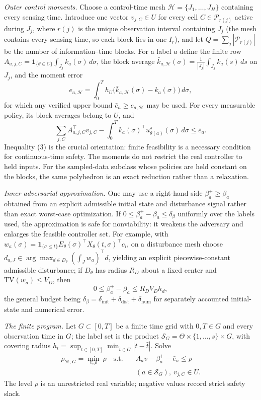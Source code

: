 \documentclass[10pt,twocolumn]{article}
\theoremstyle{plain}
\theoremstyle{definition}
\theoremstyle{remark}
\begin{document}
\emph{Outer control moments.} Choose a control-time mesh
\(\mathcal{H} = \{J_1,\dots,J_H\}\) containing every sensing time. Introduce
one vector \(v_{j,C} \in U\) for every cell \(C \in \mathcal{P}_{r(j)}\)
active during \(J_j\), where \(r(j)\) is the unique observation interval
containing \(J_j\) (the mesh contains every sensing time, so each block
lies in one \(I_r\)), and let \(Q = \sum_j |\mathcal{P}_{r(j)}|\) be the
number of information--time blocks. For a label \(a\) define the finite row
\(A_{a,j,C} = \mathbf{1}_{\{\theta \in C\}} \int_{J_j} k_a(\sigma)\, d\sigma\),
the block average
\(\bar{k}_{a,\mathcal{H}}(\sigma) = \frac{1}{|J_j|} \int_{J_j} k_a(s)\, ds\)
on \(J_j\), and the moment error
\[
e_{a,\mathcal{H}} = \int_0^T h_U\!\bigl(\bar{k}_{a,\mathcal{H}}(\sigma)
- k_a(\sigma)\bigr)\, d\sigma,
\tag{2}
\]
for which any verified upper bound \(\bar{e}_a \ge e_{a,\mathcal{H}}\) may be
used. For every measurable policy, its block averages belong to \(U\), and
\[
\sum_{j,C} A_{a,j,C}^\top v_{j,C} - \int_0^T k_a(\sigma)^\top
u^\pi_{\theta(a)}(\sigma)\, d\sigma \le \bar{e}_a.
\tag{3}
\]
Inequality (3) is the crucial orientation: finite feasibility is a
necessary condition for continuous-time safety. The moments do not restrict
the real controller to held inputs. For the sampled-data subclass whose policies are
held constant on the blocks, the same polyhedron is an exact reduction rather
than a relaxation.

\emph{Inner adversarial approximation.} One may use a right-hand side
\(\beta_a^{+} \ge \beta_a\) obtained from an explicit admissible initial
state and disturbance signal rather than exact worst-case optimization. If
\(0 \le \beta_a^{+} - \beta_a \le \delta_\beta\) uniformly over the labels
used, the approximation is safe for nonviability: it weakens the adversary
and enlarges the feasible controller set. For example, with
\(w_a(\sigma) = \mathbf{1}_{\{\sigma \le t\}}
E_\theta(\sigma)^\top X_\theta(t,\sigma)^\top c_i\), on a disturbance mesh
choose \(d_{a,J} \in \arg\max_{d \in D_\theta} (\int_J w_a)^\top d\),
yielding an explicit piecewise-constant admissible disturbance; if
\(D_\theta\) has radius \(R_D\) about a fixed center and
\(\mathrm{TV}(w_a) \le V_D\), then
\[
0 \le \beta_a^{+} - \beta_a \le R_D V_D h_d,
\tag{4}
\]
the general budget being \(\delta_\beta = \delta_{\mathrm{init}} +
\delta_{\mathrm{dist}} + \delta_{\mathrm{num}}\) for separately accounted
initial-state and numerical error.

\emph{The finite program.} Let \(G \subset [0,T]\) be a finite time grid with \(0, T \in G\) and
every observation time in \(G\); the label set is the product
\(\mathscr{S}_G = \Theta \times \{1,\dots,s\} \times G\), with covering
radius \(h_t = \sup_{t \in [0,T]} \min_{\hat{t} \in G} |t -
\hat{t}|\). Solve
\begin{align*}
\rho_{\mathcal{H},G} = \min_{v, \rho}\ \rho
\quad \text{s.t.} \quad
& A_a v - \beta_a^{+} - \bar{e}_a \le \rho \\
& (a \in \mathscr{S}_G),
\ v_{j,C} \in U.
\tag{5}
\end{align*}
The level \(\rho\) is an unrestricted real variable; negative values record
strict safety slack.
\end{document}
